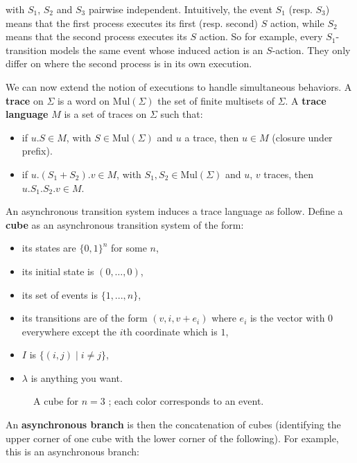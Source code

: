 \noindent with $S_1$, $S_2$ and $S_3$ pairwise independent. Intuitively, the event $S_1$ (resp. $S_3$) means that the first process executes its first (resp. second) $S$ action, while $S_2$ means that the second process executes its $S$ action. So for example, every $S_1$-transition models the same event whose induced action is an $S$-action. They only differ on where the second process is in its own execution.
	
	We can now extend the notion of executions to handle simultaneous behaviors. A \textbf{trace} on $\Sigma$ is a word on $\text{Mul}(\Sigma)$ the set of finite multisets of $\Sigma$. A \textbf{trace language} $M$ is a set of traces on $\Sigma$ such that:
		\begin{itemize}
			\item if $u.S \in M$, with $S \in \text{Mul}(\Sigma)$ and $u$ a trace, then $u \in M$ (closure under prefix).
			\item if $u.(S_1 + S_2).v \in M$, with $S_1, S_2 \in \text{Mul}(\Sigma)$ and $u$, $v$ traces, then $u.S_1.S_2.v \in M$.
		\end{itemize}

	
An asynchronous transition system induces a trace language as follow. Define a \textbf{cube} as an asynchronous transition system of the form:
\begin{itemize}
	\item its states are $\{0,1\}^n$ for some $n$, 
	\item its initial state is $(0, \ldots, 0)$,
	\item its set of events is $\{1, ..., n\}$,
	\item its transitions are of the form $(v,i,v+e_i)$ where $e_i$ is the vector with $0$ everywhere except the $i$th coordinate which is $1$,
	\item $I$ is $\{(i,j) \mid i \neq j\}$,
	\item $\lambda$ is anything you want.
\end{itemize}

		\begin{figure}[H]
			\begin{center}
    				
  			\end{center}
  			\caption{A cube for $n = 3$ ; each color corresponds to an event.}
		\end{figure}

An \textbf{asynchronous branch} is then the concatenation of cubes (identifying the upper corner of one cube with the lower corner of the following). For example, this is an asynchronous branch:

